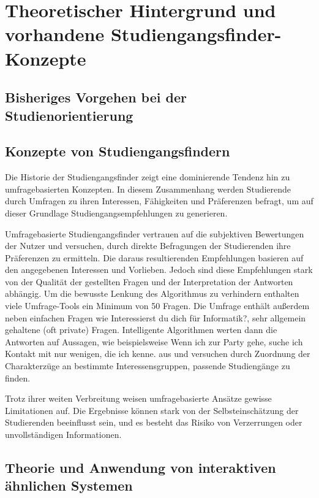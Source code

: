 \section{Theoretischer Hintergrund und vorhandene Studiengangsfinder-Konzepte}
\subsection{Bisheriges Vorgehen bei der Studienorientierung}

\subsection{Konzepte von Studiengangsfindern}
Die Historie der Studiengangsfinder zeigt eine dominierende Tendenz hin zu
umfragebasierten Konzepten. In diesem Zusammenhang werden Studierende durch
Umfragen zu ihren Interessen, Fähigkeiten und Präferenzen befragt, um auf dieser
Grundlage Studiengangsempfehlungen zu generieren.

Umfragebasierte Studiengangsfinder vertrauen auf die subjektiven Bewertungen
der Nutzer und versuchen, durch direkte Befragungen der Studierenden ihre
Präferenzen zu ermitteln. Die daraus resultierenden Empfehlungen basieren auf
den angegebenen Interessen und Vorlieben. Jedoch sind diese Empfehlungen stark
von der Qualität der gestellten Fragen und der Interpretation der Antworten
abhängig. Um die bewusste Lenkung des Algorithmus zu verhindern enthalten viele
Umfrage-Tools ein Minimum von 50 Fragen. Die Umfrage enthält außerdem neben
einfachen Fragen wie \glqq Interessierst du dich für Informatik?\grqq{}, sehr
allgemein gehaltene (oft private) Fragen. Intelligente Algorithmen werten dann
die Antworten auf Aussagen, wie beispielsweise \glqq Wenn ich zur Party gehe,
suche ich Kontakt mit nur wenigen, die ich kenne.\grqq{} aus und versuchen durch
Zuordnung der Charakterzüge an bestimmte Interessensgruppen, passende
Studiengänge zu finden.

Trotz ihrer weiten Verbreitung weisen umfragebasierte Ansätze gewisse
Limitationen auf. Die Ergebnisse können stark von der Selbsteinschätzung der
Studierenden beeinflusst sein, und es besteht das Risiko von Verzerrungen oder
unvollständigen Informationen.


\subsection{Theorie und Anwendung von interaktiven ähnlichen Systemen}
